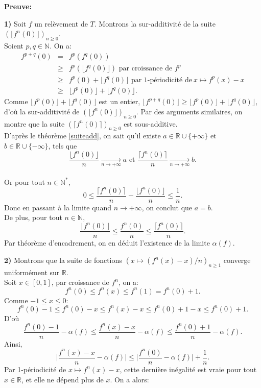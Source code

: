 \documentclass[11pt,a4 paper]{article}
\begin{document}
\textbf{Preuve:} 
	\par \textbf{1) }Soit $f$ un relèvement de $T$. Montrons la sur-additivité de la suite $(\lfloor f^n(0) \rfloor)_{n \geq 0}$.\\
	Soient $p,q \in \mathbb{N}$. On a:
		\begin{eqnarray*}
			f^{p+q}(0)&=&f^p(f^q(0))\\
			& \geq &  f^p(\lfloor f^q(0) \rfloor ) \text{ par croissance de }f^p\\
			& \geq &  f^p(0) +\lfloor f^q(0) \rfloor \text{ par 1-périodicité de}\ x \mapsto f^p(x)-x\\
			& \geq &  \lfloor f^p(0) \rfloor +\lfloor f^q(0) \rfloor.
		\end{eqnarray*}
	Comme $\lfloor f^p(0) \rfloor +\lfloor f^q(0) \rfloor$ est un entier, $\lfloor f^{p+q}(0) \rfloor \geq \lfloor f^p(0) \rfloor +\lfloor f^q(0) \rfloor$, d'où la sur-additivité de  $(\lfloor f^n(0) \rfloor)_{n \geq 0}$. Par des arguments similaires, on montre que la suite $( \lceil f^n(0) \rceil )_{n \geq 0}$ est sous-additive.
	\\
	D'après le théorème \ref{suiteadd}, on sait qu'il existe $a \in \mathbb{R} \cup \lbrace + \infty \rbrace$ et $b \in \mathbb{R} \cup \lbrace - \infty \rbrace$, tels que 
	$$\frac{\lfloor f^n(0) \rfloor }{n} \underset{n \to + \infty}{\longrightarrow} a \text{ et }\frac{\lceil f^n(0) \rceil }{n} \underset{n \to + \infty}{\longrightarrow} b.$$
	\\
	Or pour tout $n\in \mathbb{N}^*$, $$0 \leq \frac{\lceil f^n(0) \rceil }{n} - \frac{\lfloor f^n(0) \rfloor }{n} \leq \frac{1}{n}. $$
	Donc en passant à la limite quand $n \to + \infty$, on conclut que $a=b$.
	\\
	De plus, pour tout $n \in \mathbb{N}$, $$\frac{\lfloor f^n(0) \rfloor}{n} \leq \frac{ f^n(0)  }{n} \leq \frac{\lceil f^n(0) \rceil}{n}.$$ Par théorème d'encadrement, on en déduit l'existence de la limite $\alpha(f)$.
	\\
	\par\textbf{2) }Montrons que la suite de fonctions $(x\mapsto (f^n(x)-x)/n)_{n\geq1}$ converge uniformément sur $\mathbb{R}$.
	\\
	Soit $x \in [0,1]$, par croissance de $f^n$, on a:
	$$f^n(0) \leq f^n(x) \leq f^n(1)=f^n(0)+1.$$
	Comme $-1\leq x \leq 0$:
	$$f^n(0)-1\leq f^n(0) - x \leq f^n(x)-x \leq f^n(0)+1 -x \leq  f^n(0)+1 .$$
	D'où
	$$\frac{f^n(0)-1}{n} - \alpha(f) \leq \frac{f^n(x)-x}{n} - \alpha(f) \leq \frac{f^n(0)+1}{n} - \alpha(f).$$
	Ainsi,
	$$\Big|\frac{f^n(x)-x}{n}-\alpha(f)\Big|\leq \Big|\frac{f^n(0)}{n}-\alpha(f)\Big| + \frac{1}{n}.$$
	Par 1-périodicité de $x\mapsto f^n(x)-x$, cette dernière inégalité est vraie pour tout $x \in \mathbb{R}$, et elle ne dépend plus de $x$. On a alors:
\end{document}
